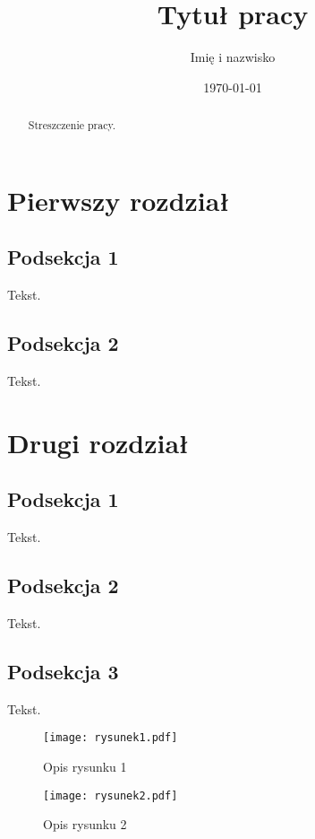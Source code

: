 \documentclass[a4paper,12pt]{article}
\title{Tytuł pracy}
\author{Imię i nazwisko}
\date{\today}
\begin{document}
\maketitle

\begin{abstract}
Streszczenie pracy.
\end{abstract}

\section{Pierwszy rozdział}

\subsection{Podsekcja 1}

Tekst.

\subsection{Podsekcja 2}

Tekst.

\section{Drugi rozdział}

\subsection{Podsekcja 1}

Tekst.

\subsection{Podsekcja 2}

Tekst.

\subsection{Podsekcja 3}

Tekst.

\begin{figure}[h]
\centering
\texttt{[image: rysunek1.pdf]}
\caption{Opis rysunku 1}
\end{figure}

\begin{figure}[h]
\centering
\texttt{[image: rysunek2.pdf]}
\caption{Opis rysunku 2}
\end{figure}
\end{document}
